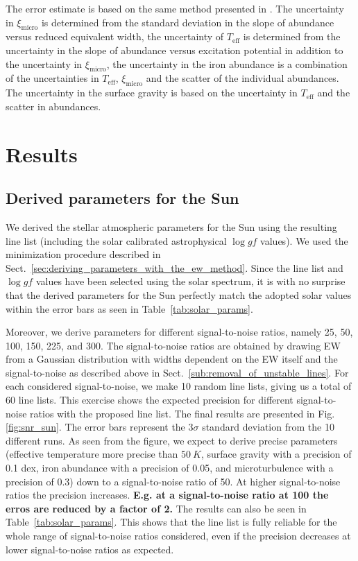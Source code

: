 \documentclass{aa}
\begin{document}
The error estimate is based on the same method presented in
\citet{Gonzalez1998}. The uncertainty in $\xi_\mathrm{micro}$ is
determined from the standard deviation in the slope of abundance
versus reduced equivalent width, the uncertainty of $T_\mathrm{eff}$
is determined from the uncertainty in the slope of abundance
versus excitation potential in addition to the uncertainty in
$\xi_\mathrm{micro}$, the uncertainty in the iron abundance
is a combination of the uncertainties in $T_\mathrm{eff}$,
$\xi_\mathrm{micro}$ and the scatter of the individual 
abundances. The uncertainty in the surface gravity is based on the
uncertainty in $T_\mathrm{eff}$ and the scatter in 
abundances.


\section{Results}
\label{sec:results}

\subsection{Derived parameters for the Sun}
\label{sec:derived_parameters_of_the_sun}

We derived the stellar atmospheric parameters for the Sun using the
resulting line list (including the solar calibrated astrophysical $\log
\mathit{gf}$ values). We used the minimization procedure described in
Sect.~\ref{sec:deriving_parameters_with_the_ew_method}. Since the line
list and $\log\mathit{gf}$ values have been selected using the solar
spectrum, it is with no surprise that the derived parameters for the Sun
perfectly match the adopted solar values within the error bars as seen
in Table~\ref{tab:solar_params}.

Moreover, we derive parameters for different signal-to-noise ratios,
namely 25, 50, 100, 150, 225, and 300. The signal-to-noise ratios
are obtained by drawing EW from a Gaussian distribution with widths
dependent on the EW itself and the signal-to-noise as described above
in Sect.~\ref{sub:removal_of_unstable_lines}. For each considered
signal-to-noise, we make 10 random line lists, giving us a total of 60
line lists. This exercise shows the expected precision for different
signal-to-noise ratios with the proposed line list. The final results
are presented in Fig.\ref{fig:snr_sun}. The error bars represent the
$3\sigma$ standard deviation from the 10 different runs. As seen
from the figure, we expect to derive precise parameters (effective
temperature more precise than $\SI{50}{K}$, surface gravity with a
precision of 0.1 dex, iron abundance with a precision of 0.05, and
microturbulence with a precision of 0.3) down to a signal-to-noise
ratio of 50. At higher signal-to-noise ratios the precision increases.
\textbf{E.g. at a signal-to-noise ratio at 100 the erros are reduced by
a factor of 2.}
The results can also be seen in Table~\ref{tab:solar_params}. This
shows that the line list is fully reliable for the whole range of
signal-to-noise ratios considered, even if the precision decreases at
lower signal-to-noise ratios as expected.
\end{document}
